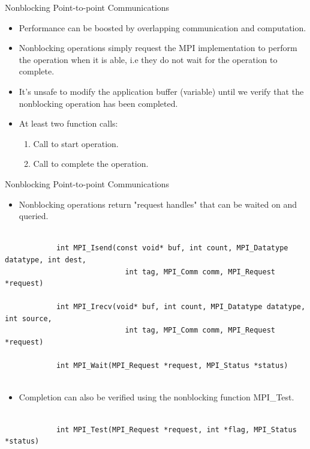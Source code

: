 \begin{frame}[fragile]{Nonblocking Point-to-point Communications}
    \begin{itemize}
        \item Performance can be boosted by overlapping communication and computation.  
         \vspace{3mm}
        \item Nonblocking operations simply request the MPI implementation to perform the operation when it is able, i.e they do not wait for the operation to complete. 
         \vspace{2mm}
        \item It's unsafe to modify the application buffer (variable) until we verify that the nonblocking operation has been completed. 
        \vspace{3mm}
        \item At least two function calls:
            \begin{enumerate}
            \item Call to start operation.
              \vspace{2mm}
            \item Call to complete the operation. 
            \end{enumerate}
    \end{itemize}
\end{frame}

\begin{frame}[fragile]{Nonblocking Point-to-point Communications}
  \begin{itemize}
  \item Nonblocking operations return "request handles" that can be waited on and queried. 
  \end{itemize}
  \scriptsize\begin{verbatim}

            int MPI_Isend(const void* buf, int count, MPI_Datatype datatype, int dest,
                            int tag, MPI_Comm comm, MPI_Request *request)
                    
            int MPI_Irecv(void* buf, int count, MPI_Datatype datatype, int source,
                            int tag, MPI_Comm comm, MPI_Request *request)
                            
            int MPI_Wait(MPI_Request *request, MPI_Status *status)
    
    \end{verbatim}
    \normalsize
    \begin{itemize}
    \item Completion can also be verified using the nonblocking function MPI\_Test.
    \end{itemize}
     \scriptsize\begin{verbatim}

            int MPI_Test(MPI_Request *request, int *flag, MPI_Status *status)
    
    \end{verbatim}
    \normalsize
\end{frame}


